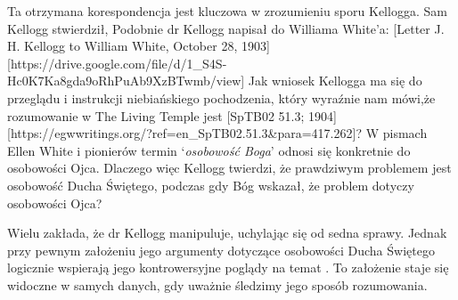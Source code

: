 Ta otrzymana korespondencja jest kluczowa w zrozumieniu sporu Kellogga. Sam Kellogg stwierdził,  Podobnie dr Kellogg napisał do Williama White'a: [Letter J. H. Kellogg to William White, October 28, 1903][https://drive.google.com/file/d/1\_S4S-Hc0K7Ka8gda9oRhPuAb9XzBTwmb/view] Jak wniosek Kellogga ma się do przeglądu i instrukcji niebiańskiego pochodzenia, który wyraźnie nam mówi,że rozumowanie w The Living Temple jest [SpTB02 51.3; 1904][https://egwwritings.org/?ref=en\_SpTB02.51.3&para=417.262]? W pismach Ellen White i pionierów termin ‘\textit{osobowość Boga}’ odnosi się konkretnie do osobowości Ojca. Dlaczego więc Kellogg twierdzi, że prawdziwym problemem jest osobowość Ducha Świętego, podczas gdy Bóg wskazał, że problem dotyczy osobowości Ojca?

Wielu zakłada, że dr Kellogg manipuluje, uchylając się od sedna sprawy. Jednak przy pewnym założeniu jego argumenty dotyczące osobowości Ducha Świętego logicznie wspierają jego kontrowersyjne poglądy na temat . To założenie staje się widoczne w samych danych, gdy uważnie śledzimy jego sposób rozumowania.

